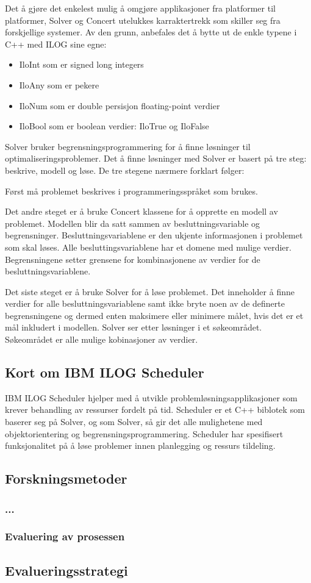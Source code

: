 Det å gjøre det enkelest mulig å omgjøre applikasjoner fra platformer til platformer, Solver og Concert utelukkes karraktertrekk som skiller seg fra forskjellige systemer. Av den grunn, anbefales det å bytte ut de enkle typene i C++ med ILOG sine egne:
\begin{itemize}
\item IloInt som er signed long integers
\item IloAny som er pekere
\item IloNum som er double persisjon floating-point verdier
\item IloBool som er boolean verdier: IloTrue og IloFalse
\end{itemize}
Solver bruker begrensningsprogrammering for å finne løsninger til optimaliseringsproblemer. Det å finne løsninger med Solver er basert på tre steg: beskrive, modell og løse. De tre stegene nærmere forklart følger:

Først må problemet beskrives i programmeringsspråket som brukes.

Det andre steget er å bruke Concert klassene for å opprette en modell av problemet. Modellen blir da satt sammen av besluttningsvariable og begrensninger. Besluttningsvariablene er den ukjente informasjonen i problemet som skal løses. Alle besluttingsvariablene har et domene med mulige verdier. Begrensningene setter grensene for kombinasjonene av verdier for de besluttningsvariablene.

Det siste steget er å bruke Solver for å løse problemet. Det inneholder å finne verdier for alle besluttningsvariablene samt ikke bryte noen av de definerte begrensningene og dermed enten maksimere eller minimere målet, hvis det er et mål inkludert i modellen. Solver ser etter løsninger i et søkeområdet. Søkeområdet er alle mulige kobinasjoner av verdier.\cite{cpsolverilog}

\subsection{Kort om IBM ILOG Scheduler}
IBM ILOG Scheduler hjelper med å utvikle problemløsningsapplikasjoner som krever behandling av ressurser fordelt på tid. Scheduler er et C++ biblotek som baserer seg på Solver, og som Solver, så gir det alle mulighetene med objektorientering og begrensningsprogrammering. Scheduler har spesifisert funksjonalitet på å løse problemer innen planlegging og ressurs tildeling.\cite{cpschedulerilog}

\subsection{Forskningsmetoder}

\subsubsection{...}

\subsubsection{Evaluering av prosessen}

\subsection{Evalueringsstrategi}

